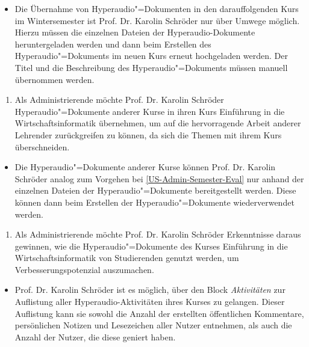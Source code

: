\begin{itemize}[resume*]
\item[\Asterisk]
Die Übernahme von Hyperaudio"=Dokumenten in den darauffolgenden Kurs im Wintersemester ist Prof. Dr. Karolin Schröder nur über Umwege möglich. Hierzu müssen die einzelnen Dateien der Hyperaudio-Dokumente heruntergeladen werden und dann beim Erstellen des Hyperaudio"=Dokuments im neuen Kurs erneut hochgeladen werden. Der Titel und die Beschreibung des Hyperaudio"=Dokuments müssen manuell übernommen werden.
\end{itemize}
\vspace{0.25cm}
\begin{enumerate}[resume*]
\item \label{US-Admin-Kurs-Eval} Als Administrierende möchte Prof. Dr. Karolin Schröder Hyperaudio"=Dokumente anderer Kurse in ihren Kurs \glqq Einführung in die Wirtschaftsinformatik\grqq{} übernehmen, um auf die hervorragende Arbeit anderer Lehrender zurückgreifen zu können, da sich die Themen mit ihrem Kurs überschneiden.
\end{enumerate}
\begin{itemize}[resume*]
\item[\Asterisk]
Die Hyperaudio"=Dokumente anderer Kurse können Prof. Dr. Karolin Schröder analog zum Vorgehen bei \ref{US-Admin-Semester-Eval} nur anhand der einzelnen Dateien der Hyperaudio"=Dokumente bereitgestellt werden. Diese können dann beim Erstellen der Hyperaudio"=Dokumente wiederverwendet werden.
\end{itemize}
\vspace{0.25cm}
\begin{enumerate}[resume*]
\item \label{US-Admin-Statistik-Eval} Als Administrierende möchte Prof. Dr. Karolin Schröder Erkenntnisse daraus gewinnen, wie die Hyperaudio"=Dokumente des Kurses \glqq Einführung in die Wirtschaftsinformatik\grqq{} von Studierenden genutzt werden, um Verbesserungspotenzial auszumachen.
\end{enumerate}
\begin{itemize}[resume*]
\item[\Checkmark]
Prof. Dr. Karolin Schröder ist es möglich, über den Block \textit{Aktivitäten} zur Auflistung aller Hyperaudio-Aktivitäten ihres Kurses zu gelangen. Dieser Auflistung kann sie sowohl die Anzahl der erstellten öffentlichen Kommentare, persönlichen Notizen und Lesezeichen aller Nutzer entnehmen, als auch die Anzahl der Nutzer, die diese geniert haben.
\end{itemize}
